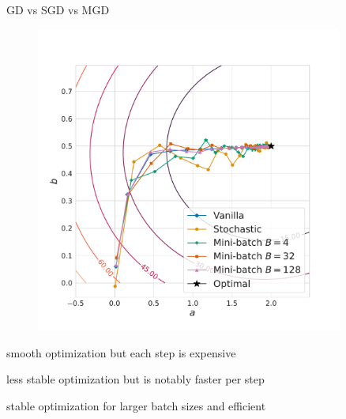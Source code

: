 \begin{frame}{GD vs SGD vs MGD}

\begin{minipage}{.6\textwidth}
    \begin{figure}
        \centering
        \includegraphics[width=0.9\textwidth]{images/chapter_7/gradient_optimisation_contour.pdf}
    \end{figure}
\end{minipage}
\begin{minipage}{.39\textwidth}
    \blist
        \item {} smooth optimization but each step is expensive
        \item {} less stable optimization but is notably faster per step
        \item {} stable optimization for larger batch sizes and efficient
    \elist
\end{minipage}
    
\end{frame}

